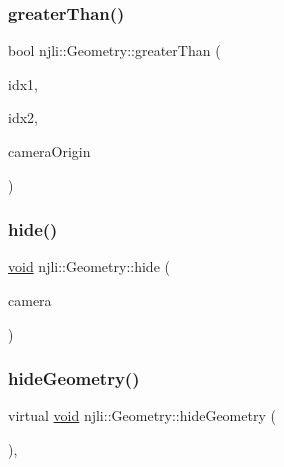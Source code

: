 \subsubsection{\texorpdfstring{greater\+Than()}{greaterThan()}}
{\footnotesize\ttfamily bool njli\+::\+Geometry\+::greater\+Than (\begin{DoxyParamCaption}\item[{const size\+\_\+t}]{idx1,  }\item[{const size\+\_\+t}]{idx2,  }\item[{const bt\+Vector3 \&}]{camera\+Origin }\end{DoxyParamCaption})\hspace{0.3cm}{\ttfamily [private]}}

\mbox{\label{classnjli_1_1_geometry_ac369079a8761aeabf7fcef930690db42}} 
\subsubsection{\texorpdfstring{hide()}{hide()}}
{\footnotesize\ttfamily \mbox{\hyperlink{_thread_8h_af1e856da2e658414cb2456cb6f7ebc66}{void}} njli\+::\+Geometry\+::hide (\begin{DoxyParamCaption}\item[{\mbox{\hyperlink{classnjli_1_1_camera}{Camera}} $\ast$}]{camera }\end{DoxyParamCaption})}

\mbox{\label{classnjli_1_1_geometry_a3780bbd093a4b163de3499e5726667f9}} 
\subsubsection{\texorpdfstring{hide\+Geometry()}{hideGeometry()}}
{\footnotesize\ttfamily virtual \mbox{\hyperlink{_thread_8h_af1e856da2e658414cb2456cb6f7ebc66}{void}} njli\+::\+Geometry\+::hide\+Geometry (\begin{DoxyParamCaption}\item[{\mbox{\hyperlink{classnjli_1_1_node}{Node}} $\ast$}]{ }\end{DoxyParamCaption})\hspace{0.3cm}{\ttfamily [protected]}, {}}



